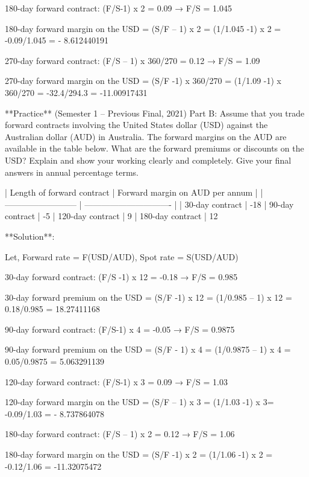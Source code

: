 \documentclass{article}
\begin{document}
180-day forward contract: (F/S-1) x 2 = 0.09 → F/S = 1.045

180-day forward margin on the USD = (S/F – 1) x 2 = (1/1.045 -1) x 2 = -0.09/1.045 = - 8.612440191 %

270-day forward contract: (F/S – 1) x 360/270 = 0.12 → F/S = 1.09

270-day forward margin on the USD = (S/F -1) x 360/270 = (1/1.09 -1) x 360/270 = -32.4/294.3 = -11.00917431%

**Practice** (Semester 1 -- Previous Final, 2021) Part B: Assume that you trade forward contracts involving the United States dollar (USD) against the Australian dollar (AUD) in Australia. The forward margins on the AUD are available in the table below. What are the forward premiums or discounts on the USD? Explain and show your working clearly and completely. Give your final answers in annual percentage terms.

| Length of forward contract | Forward margin on AUD per annum |
| -------------------------- | ------------------------------- |
| 30-day contract            | -18%
| 90-day contract            | -5%
| 120-day contract           | 9%
| 180-day contract           | 12%

**Solution**:

Let, Forward rate = F(USD/AUD), Spot rate = S(USD/AUD)

30-day forward contract: (F/S -1) x 12 = -0.18 → F/S = 0.985

30-day forward premium on the USD = (S/F -1) x 12 = (1/0.985 – 1) x 12 = 0.18/0.985 = 18.27411168 %

90-day forward contract: (F/S-1) x 4 = -0.05 → F/S = 0.9875

90-day forward premium on the USD = (S/F - 1) x 4 = (1/0.9875 – 1) x 4 = 0.05/0.9875 = 5.063291139 %

120-day forward contract: (F/S-1) x 3 = 0.09 → F/S = 1.03

120-day forward margin on the USD = (S/F – 1) x 3 = (1/1.03 -1) x 3= -0.09/1.03 = - 8.737864078 %

180-day forward contract: (F/S – 1) x 2 = 0.12 → F/S = 1.06

180-day forward margin on the USD = (S/F -1) x 2 = (1/1.06 -1) x 2 = -0.12/1.06 = -11.32075472%
\end{document}
